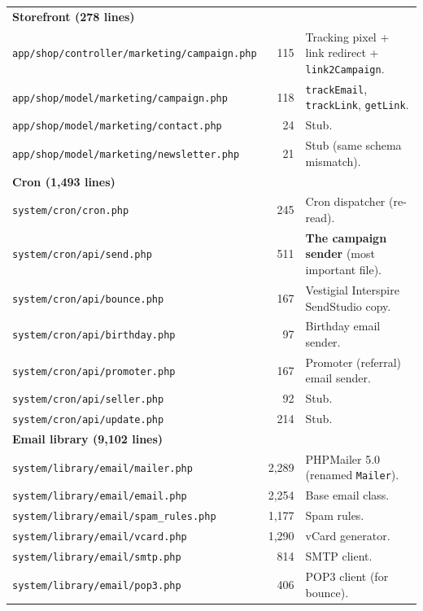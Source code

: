 \documentclass[11pt,a4paper]{article}
\begin{document}
\begin{table}[htbp]
\begin{tabularx}{\columnwidth}{lrX}
\midrule
\multicolumn{3}{l}{\textbf{Storefront (278 lines)}} \\
\texttt{app/shop/controller/marketing/campaign.php}      & 115 & Tracking pixel + link redirect + \texttt{link2Campaign}. \\
\texttt{app/shop/model/marketing/campaign.php}           & 118 & \texttt{trackEmail}, \texttt{trackLink}, \texttt{getLink}. \\
\texttt{app/shop/model/marketing/contact.php}            & 24  & Stub. \\
\texttt{app/shop/model/marketing/newsletter.php}         & 21  & Stub (same schema mismatch). \\
\midrule
\multicolumn{3}{l}{\textbf{Cron (1,493 lines)}} \\
\texttt{system/cron/cron.php}                            & 245 & Cron dispatcher (re-read). \\
\texttt{system/cron/api/send.php}                        & 511 & \textbf{The campaign sender} (most important file). \\
\texttt{system/cron/api/bounce.php}                      & 167 & Vestigial Interspire SendStudio copy. \\
\texttt{system/cron/api/birthday.php}                    & 97  & Birthday email sender. \\
\texttt{system/cron/api/promoter.php}                    & 167 & Promoter (referral) email sender. \\
\texttt{system/cron/api/seller.php}                      & 92  & Stub. \\
\texttt{system/cron/api/update.php}                      & 214 & Stub. \\
\midrule
\multicolumn{3}{l}{\textbf{Email library (9,102 lines)}} \\
\texttt{system/library/email/mailer.php}                 & 2,289 & PHPMailer 5.0 (renamed \texttt{Mailer}). \\
\texttt{system/library/email/email.php}                  & 2,254 & Base email class. \\
\texttt{system/library/email/spam\_rules.php}            & 1,177 & Spam rules. \\
\texttt{system/library/email/vcard.php}                  & 1,290 & vCard generator. \\
\texttt{system/library/email/smtp.php}                   & 814  & SMTP client. \\
\texttt{system/library/email/pop3.php}                   & 406  & POP3 client (for bounce). \\

\end{tabularx}
\end{table}
\end{document}
